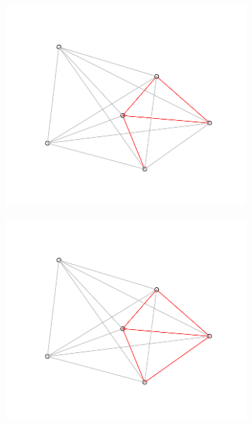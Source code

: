 \begin{figure}[h]
\begin{subfigure}{0.25\textwidth}
  \includegraphics[width=\linewidth]{./pictures/4/triangulation_5.pdf}
  \label{fig:3-triangulation_5}
\end{subfigure}\hfil %
\begin{subfigure}{0.25\textwidth}
  \includegraphics[width=\linewidth]{./pictures/4/triangulation_6.pdf}
  \label{fig:3-triangulation_6}
\end{subfigure}\hfil %
\begin{subfigure}{0.25\textwidth}

\end{subfigure}
\end{figure}
